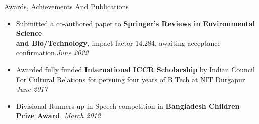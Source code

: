 \documentclass{resume} %
\begin{document}
\begin{rSection}{Awards, Achievements And Publications}   
\begin{itemize}[noitemsep,label=\small\textbullet]
\item Submitted a co-authored paper to \textbf{Springer's Reviews in Environmental Science \\and Bio/Technology}, impact factor 14.284, awaiting acceptance confirmation.\hfill {\sl June 2022} 
\item Awarded fully funded \textbf{International ICCR Scholarship} by Indian Council \\For Cultural Relations for persuing four years of B.Tech at NIT Durgapur \hfill {\sl June 2017} 
\item Divisional Runners-up in Speech competition in \textbf{Bangladesh Children Prize Award}, \hfill {\sl March 2012} 
\end{itemize}  
\end{rSection} 



  
\end{document}
